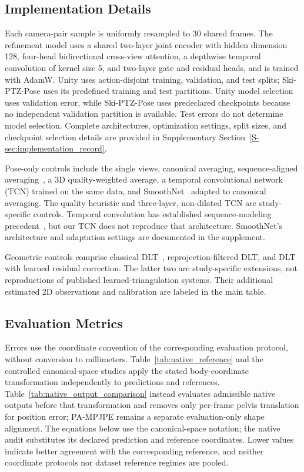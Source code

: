 \documentclass[preprint,12pt]{elsarticle}
\begin{document}
\subsection{Implementation Details}
\label{subsec:implementation_details}

Each camera-pair sample is uniformly resampled to 30 shared frames. The refinement model uses a shared two-layer joint encoder with hidden dimension 128, four-head bidirectional cross-view attention, a depthwise temporal convolution of kernel size 5, and two-layer gate and residual heads, and is trained with AdamW. Unity uses action-disjoint training, validation, and test splits; Ski-PTZ-Pose uses its predefined training and test partitions. Unity model selection uses validation error, while Ski-PTZ-Pose uses predeclared checkpoints because no independent validation partition is available. Test errors do not determine model selection. Complete architectures, optimization settings, split sizes, and checkpoint selection details are provided in Supplementary Section~\ref{S-sec:implementation_record}.

Pose-only controls include the single views, canonical averaging, sequence-aligned averaging~\cite{umeyama1991least}, a 3D quality-weighted average, a temporal convolutional network (TCN) trained on the same data, and SmoothNet~\cite{zeng2022smoothnet} adapted to canonical averaging. The quality heuristic and three-layer, non-dilated TCN are study-specific controls. Temporal convolution has established sequence-modeling precedent~\cite{bai2018empirical}, but our TCN does not reproduce that architecture. SmoothNet's architecture and adaptation settings are documented in the supplement.

Geometric controls comprise classical DLT~\cite{hartley2004multiple}, reprojection-filtered DLT, and DLT with learned residual correction. The latter two are study-specific extensions, not reproductions of published learned-triangulation systems. Their additional estimated 2D observations and calibration are labeled in the main table.

\subsection{Evaluation Metrics}

Errors use the coordinate convention of the corresponding evaluation protocol, without conversion to millimeters. Table~\ref{tab:native_reference} and the controlled canonical-space studies apply the stated body-coordinate transformation independently to predictions and references. Table~\ref{tab:native_output_comparison} instead evaluates admissible native outputs before that transformation and removes only per-frame pelvis translation for position error; PA-MPJPE remains a separate evaluation-only shape alignment. The equations below use the canonical-space notation; the native audit substitutes its declared prediction and reference coordinates. Lower values indicate better agreement with the corresponding reference, and neither coordinate protocols nor dataset reference regimes are pooled.
\end{document}
